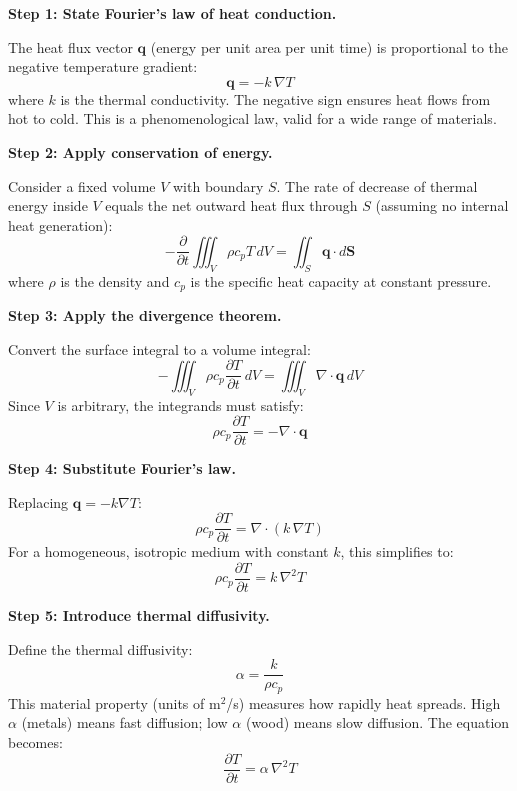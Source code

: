 \textbf{Step 1: State Fourier's law of heat conduction.}

The heat flux vector $\mathbf{q}$ (energy per unit area per unit time) is proportional to the negative temperature gradient:
\begin{equation}
\mathbf{q} = -k\,\nabla T
\end{equation}
where $k$ is the thermal conductivity. The negative sign ensures heat flows from hot to cold. This is a phenomenological law, valid for a wide range of materials.

\textbf{Step 2: Apply conservation of energy.}

Consider a fixed volume $V$ with boundary $S$. The rate of decrease of thermal energy inside $V$ equals the net outward heat flux through $S$ (assuming no internal heat generation):
\begin{equation}
-\frac{\partial}{\partial t}\iiint_V \rho c_p T\, dV = \iint_S \mathbf{q} \cdot d\mathbf{S}
\end{equation}
where $\rho$ is the density and $c_p$ is the specific heat capacity at constant pressure.

\textbf{Step 3: Apply the divergence theorem.}

Convert the surface integral to a volume integral:
\begin{equation}
-\iiint_V \rho c_p \frac{\partial T}{\partial t}\, dV = \iiint_V \nabla \cdot \mathbf{q}\, dV
\end{equation}
Since $V$ is arbitrary, the integrands must satisfy:
\begin{equation}
\rho c_p \frac{\partial T}{\partial t} = -\nabla \cdot \mathbf{q}
\end{equation}

\textbf{Step 4: Substitute Fourier's law.}

Replacing $\mathbf{q} = -k\nabla T$:
\begin{equation}
\rho c_p \frac{\partial T}{\partial t} = \nabla \cdot (k\,\nabla T)
\end{equation}
For a homogeneous, isotropic medium with constant $k$, this simplifies to:
\begin{equation}
\rho c_p \frac{\partial T}{\partial t} = k\,\nabla^2 T
\end{equation}

\textbf{Step 5: Introduce thermal diffusivity.}

Define the thermal diffusivity:
\begin{equation}
\alpha = \frac{k}{\rho c_p}
\end{equation}
This material property (units of m$^2$/s) measures how rapidly heat spreads. High $\alpha$ (metals) means fast diffusion; low $\alpha$ (wood) means slow diffusion. The equation becomes:
\begin{equation}
\frac{\partial T}{\partial t} = \alpha\,\nabla^2 T
\end{equation}

